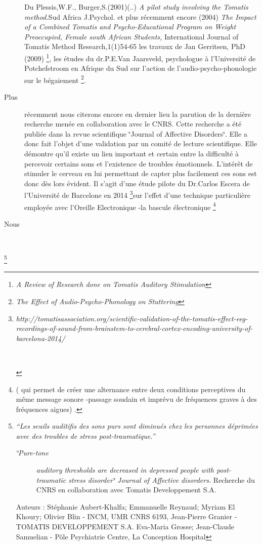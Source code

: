 \begin{description}
{Du Plessis,W.F., Burger,S.(2001)(..) \emph{A pilot study involving
the Tomatis method.}Sud Africa J.Psychol. et plus récemment encore
(2004) \emph{The Impact of a Combined Tomatis and Psycho-Educational
Program on Weight Preoccupied, Female south African Students, }International
Journal of Tomatis Method Research,1(1)54-65} les travaux de Jan Gerritsen, PhD (2009) \footnote{\emph{A Review of Research done on Tomatis Auditory Stimulation}},
les études du dr.P.E.Van Jaarsveld, psychologue à l'Université de
Potchefstroom en Afrique du Sud sur l'action de l'audio-psycho-phonologie
sur le bégaiement \footnote{\emph{The Effect of Audio-Psycho-Phonology on Stuttering}}.
\item [{Plus}] récemment nous citerons encore en dernier lieu la parution
de la dernière recherche menée en collaboration avec le CNRS. Cette
recherche a été publiée dans la revue scientifique \char`\"{}Journal
of Affective Disorders\char`\"{}. Elle a donc fait l'objet d'une validation
par un comité de lecture scientifique. Elle démontre qu'il existe
un lien important et certain entre la difficulté à percevoir certains
sons et l'existence de troubles émotionnels. L'intérêt de stimuler
le cerveau en lui permettant de capter plus facilement ces sons est
donc dès lors évident. Il s'agit d'une étude pilote du Dr.Carlos Escera
de l'Université de Barcelone en 2014 \footnote{\begin{description}
\item [{\emph{http://tomatisassociation.org/scientific-validation-of-the-tomatis-effect-eeg-recordings-of-sound-from-brainstem-to-cerebral-cortex-encoding-university-of-barcelona-2014/}}]~
\end{description}
}sur l'effet d'une technique particulière employée avec l'Oreille Electronique
-la bascule électronique \footnote{( qui permet de créer une alternance entre deux conditions perceptives
du même message sonore -passage soudain et imprévu de fréquences graves
à des fréquences aigues) . }
\item [{Nous}]~
\end{description}
\emph{}\footnote{\emph{``Les seuils auditifis des sons purs sont diminués chez les
personnes déprimées avec des troubles de stress post-traumatique.''}
\begin{description}
\item [{\emph{\char`\"{}Pure-tone}}] \emph{auditory thresholds are decreased
in depressed people with post-traumatic stress disorder\char`\"{}
Journal of Affective disorders.} Recherche du CNRS en collaboration
avec Tomatis Developpement S.A.
\end{description}
Auteurs : Stéphanie Aubert-Khalfa; Emmanuelle Reynaud; Myriam El Khoury;
Olivier Blin - INCM, UMR CNRS 6193, Jean-Pierre Granier - TOMATIS
DEVELOPPEMENT S.A. Eva-Maria Grosse; Jean-Claude Samuelian - Pôle
Psychiatrie Centre, La Conception Hospital }

